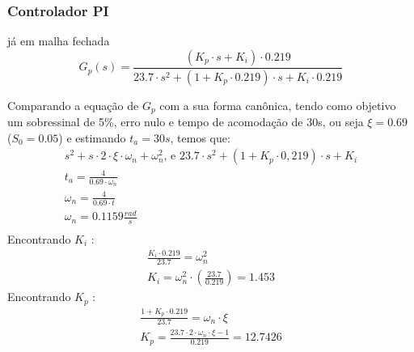 \documentclass[
	article,			%
	11pt,				%
	oneside,			%
	a4paper,			%
	section=TITLE,		%
	english,			%
	brazil,				%
	sumario=tradicional
	]{abntex2}
\begin{document}
\subsubsection{Controlador PI}
 já em malha fechada
\begin{equation}
     G_p(s) = \frac{ ( K_p \cdot s + K_i) \cdot 0.219 }{23.7 \cdot s^2 + (1 + K_p \cdot 0.219) \cdot s  + K_i \cdot 0.219}
     \label{eq:planta-com-pi}
\end{equation}

    
    Comparando a equação de $G_p$ com a sua forma canônica, tendo como objetivo um sobressinal de 5\%, erro nulo e tempo de acomodação de 30s, ou seja $\xi = 0.69$ ($S_0 = 0.05$) e estimando $t_a = 30s$, temos que:
    \begin{equation} \begin{split}
        s^2 + s \cdot 2 \cdot \xi \cdot \omega_n + \omega_n^2  \text{, e   } %
        23.7 \cdot s^2 + (1 + K_p \cdot 0,219) \cdot s + K_i \\
        t_a = \frac{4}{0.69 \cdot \omega_n} \\
        \omega_n = \frac{4}{0.69 \cdot t} \\
        \omega_n = 0.1159 \frac{rad}{s} \\
    \end{split} \end{equation}
    Encontrando $K_i$ : 
    \begin{equation} \begin{split}
        \frac{K_i \cdot 0.219}{23.7} = \omega_n^2 \\
        K_i = \omega_n^2 \cdot \left( \frac{23.7}{0.219} \right) = 1.453
    \end{split} \end{equation}
        Encontrando $K_p$ :
    \begin{equation} \begin{split}
        \frac{1 + K_p \cdot 0.219}{23.7} =  \omega_n \cdot \xi \\
        K_p =  \frac{23.7 \cdot 2 \cdot \omega_n \cdot \xi - 1}{0.219} = 12.7426 
    \end{split} \end{equation}
\end{document}
